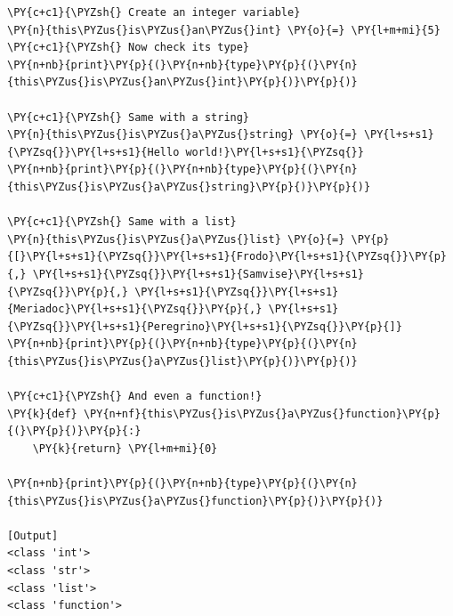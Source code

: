 \begin{Verbatim}[label=\makebox{\url{https://github.com/lucabaldini/cmepda/tree/master/slides/latex/snippets/everything\_is\_a\_class.py}},commandchars=\\\{\}]
\PY{c+c1}{\PYZsh{} Create an integer variable}
\PY{n}{this\PYZus{}is\PYZus{}an\PYZus{}int} \PY{o}{=} \PY{l+m+mi}{5}
\PY{c+c1}{\PYZsh{} Now check its type}
\PY{n+nb}{print}\PY{p}{(}\PY{n+nb}{type}\PY{p}{(}\PY{n}{this\PYZus{}is\PYZus{}an\PYZus{}int}\PY{p}{)}\PY{p}{)}

\PY{c+c1}{\PYZsh{} Same with a string}
\PY{n}{this\PYZus{}is\PYZus{}a\PYZus{}string} \PY{o}{=} \PY{l+s+s1}{\PYZsq{}}\PY{l+s+s1}{Hello world!}\PY{l+s+s1}{\PYZsq{}} 
\PY{n+nb}{print}\PY{p}{(}\PY{n+nb}{type}\PY{p}{(}\PY{n}{this\PYZus{}is\PYZus{}a\PYZus{}string}\PY{p}{)}\PY{p}{)}

\PY{c+c1}{\PYZsh{} Same with a list}
\PY{n}{this\PYZus{}is\PYZus{}a\PYZus{}list} \PY{o}{=} \PY{p}{[}\PY{l+s+s1}{\PYZsq{}}\PY{l+s+s1}{Frodo}\PY{l+s+s1}{\PYZsq{}}\PY{p}{,} \PY{l+s+s1}{\PYZsq{}}\PY{l+s+s1}{Samvise}\PY{l+s+s1}{\PYZsq{}}\PY{p}{,} \PY{l+s+s1}{\PYZsq{}}\PY{l+s+s1}{Meriadoc}\PY{l+s+s1}{\PYZsq{}}\PY{p}{,} \PY{l+s+s1}{\PYZsq{}}\PY{l+s+s1}{Peregrino}\PY{l+s+s1}{\PYZsq{}}\PY{p}{]}
\PY{n+nb}{print}\PY{p}{(}\PY{n+nb}{type}\PY{p}{(}\PY{n}{this\PYZus{}is\PYZus{}a\PYZus{}list}\PY{p}{)}\PY{p}{)}

\PY{c+c1}{\PYZsh{} And even a function!}
\PY{k}{def} \PY{n+nf}{this\PYZus{}is\PYZus{}a\PYZus{}function}\PY{p}{(}\PY{p}{)}\PY{p}{:}
    \PY{k}{return} \PY{l+m+mi}{0}
    
\PY{n+nb}{print}\PY{p}{(}\PY{n+nb}{type}\PY{p}{(}\PY{n}{this\PYZus{}is\PYZus{}a\PYZus{}function}\PY{p}{)}\PY{p}{)}

[Output]
<class 'int'>
<class 'str'>
<class 'list'>
<class 'function'>
\end{Verbatim}